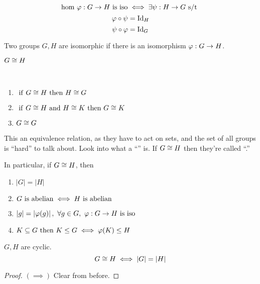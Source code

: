\documentclass[12pt]{article}
\newcommand{\order}[1]{\left\lvert#1\right\rvert}
\newcommand{\id}[1][]{\mathrm{Id}}
\newcommand\subgroup{\le}
\begin{document}
\bboxcoro
\begin{coro}
    \[
        \text{hom }\varphi : G\to H\ \mathrm{is}\ \text{iso}
        \iff\exists\psi:H\to G\text{ s/t }
    \]
    \[
        \vphi\circ\psi=\id_H
    \]
    \[
        \psi\circ\vphi=\id_G
    \]
\end{coro}
\ebox

\bboxdefn
\begin{defn}
    Two groups \(G,H\) are isomorphic if there is an isomorphism \(\varphi:G\to H\).
    \bboxnota
    \begin{nota}
        \(G\cong H\)
    \end{nota}
    \ebox
\end{defn}
\ebox

\bboxnote
\begin{note}\ 
    \begin{enumerate}
        \item \(\ \mathrm{if}\  G\cong H\ \mathrm{then}\  H\cong G\)
        \item \(\ \mathrm{if}\  G\cong H\mathrm{\ and\ }H\cong K\ \mathrm{then}\  G\cong K\)
        \item \(G\cong G\)
    \end{enumerate}
    This  an equivalence relation, as they have to act on sets,
    and the set of all groups is ``hard'' to talk about. Look into what a
    ``\TB{proper class}'' is. If \(G\cong H\) then they're called ``.''

    In particular, if \(G\cong H\), then
    \begin{enumerate}
        \item \(\order{G}=\order{H}\)
        \item \(G\ \mathrm{is}\ \mathrm{abelian}\iff H\ \mathrm{is}\ \mathrm{abelian}\)
        \item \(\order{g}=\order{\vphi(g)},\ \forall g\in G,\
            \vphi:G\to H\is\TR{iso}\)
        \item \(K\ssq G\tthen K\subgroup G\iff\vphi(K)\subgroup H\)
    \end{enumerate}
\end{note}
\ebox


\bboxprop
\begin{prop}
    \(G,H\) are cyclic.
    \[
        G \isom H \iff \order{G} = \order{H}
    \]
\end{prop}
\ebox

\bboxproof
\begin{proof}
    \((\implies)\) Clear from before.
\end{proof}
\ebox
\end{document}
